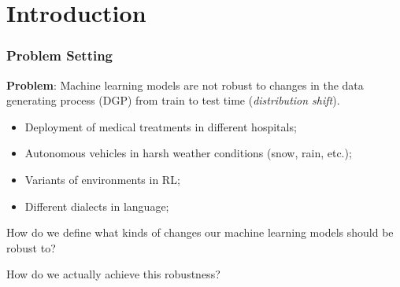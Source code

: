 \documentclass{beamer}
\begin{document}
\section{Introduction}
\begin{frame}
\frametitle{Problem Setting}
\textbf{Problem}: Machine learning models are not robust to changes in the data generating process (DGP) from train to test time (\textit{distribution shift}).
\bigskip

\begin{itemize}
	\item Deployment of medical treatments in different hospitals;
	\item Autonomous vehicles in harsh weather conditions (snow, rain, etc.);
	\item Variants of environments in RL;
	\item Different dialects in language;
\end{itemize}

\bigskip
How do we define what kinds of changes our machine learning models should be robust to?

\medskip
How do we actually achieve this robustness?

\end{frame}
\end{document}
